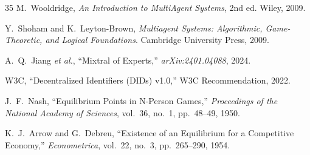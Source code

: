 \documentclass[11pt,letterpaper]{article}
\begin{document}
\begin{thebibliography}{35}
M.~Wooldridge, \emph{An Introduction to MultiAgent Systems}, 2nd ed. Wiley, 2009.

Y.~Shoham and K.~Leyton-Brown, \emph{Multiagent Systems: Algorithmic, Game-Theoretic, and Logical Foundations}. Cambridge University Press, 2009.

A.~Q.~Jiang \emph{et al.}, ``Mixtral of Experts,'' \emph{arXiv:2401.04088}, 2024.

W3C, ``Decentralized Identifiers (DIDs) v1.0,'' W3C Recommendation, 2022.

J.~F.~Nash, ``Equilibrium Points in N-Person Games,'' \emph{Proceedings of the National Academy of Sciences}, vol.~36, no.~1, pp.~48--49, 1950.

K.~J.~Arrow and G.~Debreu, ``Existence of an Equilibrium for a Competitive Economy,'' \emph{Econometrica}, vol.~22, no.~3, pp.~265--290, 1954.

\end{thebibliography}
\end{document}
